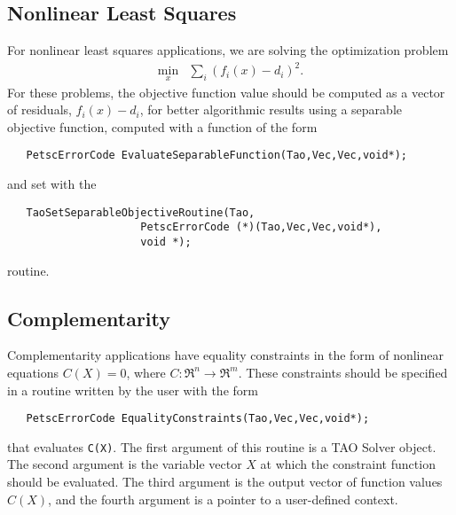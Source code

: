 \subsection{Nonlinear Least Squares}\label{sec:evalsof}
For nonlinear least squares applications, we are solving
the optimization problem
\[
\begin{array}{ll}
\displaystyle \min_{x} & \displaystyle \sum_i (f_i(x) - d_i)^2.
\end{array}
\]
For these problems, the objective function value should be computed as a 
vector of residuals, $f_i(x) - d_i$, for better algorithmic results using 
a separable objective function, computed with a function of the form
\begin{verbatim}
   PetscErrorCode EvaluateSeparableFunction(Tao,Vec,Vec,void*);
\end{verbatim}
and set with the
\begin{verbatim}
   TaoSetSeparableObjectiveRoutine(Tao,
                     PetscErrorCode (*)(Tao,Vec,Vec,void*),
                     void *);
\end{verbatim}
routine.

\begin{comment}
The computation of the Jacobian of the separable objective routine 
should be in a routine that looks like
\begin{verbatim}
   PetscErrorCode EvaluateJacobian(Tao,Vec,Mat,Mat,MatStructure*,
                     void*);
\end{verbatim}
This function can be registered with TAO by using the function
\begin{verbatim}
   TaoSetJacobianRoutine(Tao,Mat J, Mat Jpre,
                     PetscErrorCode (*)(Tao,Vec,Mat,Mat,
                     MatStructure*,void*), void *);
\end{verbatim}
The first argument is the TAO solver object, the second and third arguments
are the Mat object where the Jacobian will be stored and the Mat object
that will be used for the preconditioning (they may be the same). The
fourth 
argument is the function that evaluates the Jacobian, 
and the fifth argument is a pointer to a user defined context,
cast as a {\tt void*} pointer.
\end{comment}



\subsection{Complementarity}
Complementarity applications have equality constraints in the form of 
nonlinear equations 
$C(X) = 0$, where $C: \Re^n \to \Re^m$.
These constraints should be specified in a 
routine written by the user with the form
\begin{verbatim}
   PetscErrorCode EqualityConstraints(Tao,Vec,Vec,void*);
\end{verbatim}
that evaluates {\tt C(X)}.
\noindent
The first argument of this routine is a TAO Solver object.  The second argument
is the variable vector $X$ at which the constraint function should be 
evaluated.  
The third argument is the output vector of function values $C(X)$, and the fourth
argument is a pointer to a user-defined context.

